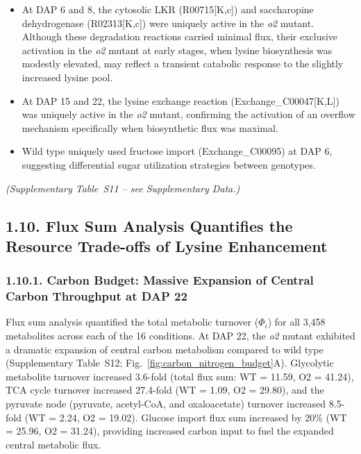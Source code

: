 \documentclass[12pt,a4paper]{article}
\begin{document}
\begin{itemize}
    \item At DAP 6 and 8, the cytosolic LKR (R00715[K,c]) and saccharopine dehydrogenase (R02313[K,c]) were uniquely active in the \textit{o2} mutant. Although these degradation reactions carried minimal flux, their exclusive activation in the \textit{o2} mutant at early stages, when lysine biosynthesis was modestly elevated, may reflect a transient catabolic response to the slightly increased lysine pool.
    
    \item At DAP 15 and 22, the lysine exchange reaction (Exchange\_C00047[K,L]) was uniquely active in the \textit{o2} mutant, confirming the activation of an overflow mechanism specifically when biosynthetic flux was maximal.
    
    \item Wild type uniquely used fructose import (Exchange\_C00095) at DAP 6, suggesting differential sugar utilization strategies between genotypes.
\end{itemize}


\noindent\textit{(Supplementary Table~S11 -- see Supplementary Data.)}


\subsection{1.10. Flux Sum Analysis Quantifies the Resource Trade-offs of Lysine Enhancement}

\subsubsection{1.10.1. Carbon Budget: Massive Expansion of Central Carbon Throughput at DAP 22}

Flux sum analysis quantified the total metabolic turnover ($\Phi_i$) for all 3,458 metabolites across each of the 16 conditions. At DAP 22, the \textit{o2} mutant exhibited a dramatic expansion of central carbon metabolism compared to wild type (Supplementary Table~S12; Fig.~\ref{fig:carbon_nitrogen_budget}A). Glycolytic metabolite turnover increased 3.6-fold (total flux sum: WT = 11.59, O2 = 41.24), TCA cycle turnover increased 27.4-fold (WT = 1.09, O2 = 29.80), and the pyruvate node (pyruvate, acetyl-CoA, and oxaloacetate) turnover increased 8.5-fold (WT = 2.24, O2 = 19.02). Glucose import flux sum increased by 20\% (WT = 25.96, O2 = 31.24), providing increased carbon input to fuel the expanded central metabolic flux.
\end{document}
